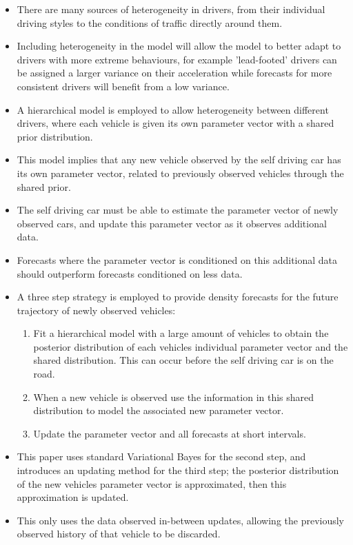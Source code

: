 \documentclass[12pt,a4paper]{article}\usepackage[]{graphicx}\usepackage[]{color}
\begin{document}
\begin{itemize}
\item There are many sources of heterogeneity in drivers, from their individual driving styles to the conditions of traffic directly around them.
\item Including heterogeneity in the model will allow the model to better adapt to drivers with more extreme behaviours, for example 'lead-footed' drivers can be assigned a larger variance on their acceleration while forecasts for more consistent drivers will benefit from a low variance.
\item A hierarchical model is employed to allow heterogeneity between different drivers, where each vehicle is given its own parameter vector with a shared prior distribution.
\item This model implies that any new vehicle observed by the self driving car has its own parameter vector, related to previously observed vehicles through the shared prior.
\item The self driving car must be able to estimate the parameter vector of newly observed cars, and update this parameter vector as it observes additional data.
\item Forecasts where the parameter vector is conditioned on this additional data should outperform forecasts conditioned on less data.
\item A three step strategy is employed to provide density forecasts for the future trajectory of newly observed vehicles:
\begin{enumerate}
\item Fit a hierarchical model with a large amount of vehicles to obtain the posterior distribution of each vehicles individual parameter vector and the shared distribution. This can occur before the self driving car is on the road.
\item When a new vehicle is observed use the information in this shared distribution to model the associated new parameter vector. 
\item Update the parameter vector and all forecasts at short intervals.
\end{enumerate}
\item This paper uses standard Variational Bayes for the second step, and introduces an updating method for the third step; the posterior distribution of the new vehicles parameter vector is approximated, then this approximation is updated.
\item This only uses the data observed in-between updates, allowing the previously observed history of that vehicle to be discarded.

\end{itemize}
\end{document}
